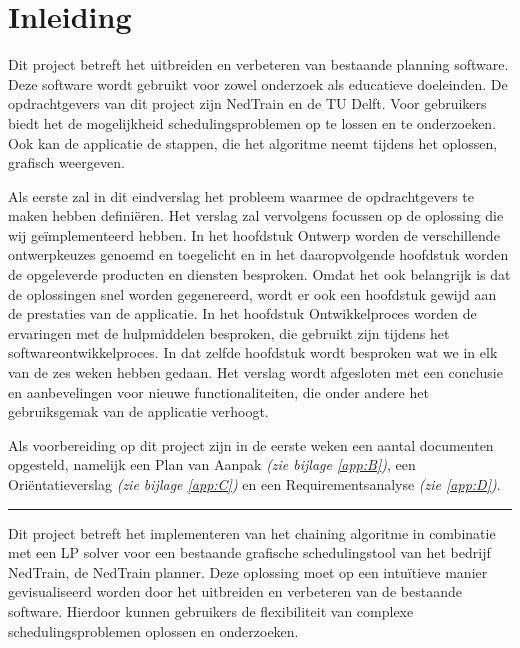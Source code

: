 \section{Inleiding}
Dit project betreft het uitbreiden en verbeteren van bestaande planning software. Deze software wordt gebruikt voor zowel onderzoek als educatieve doeleinden. De opdrachtgevers van dit project zijn NedTrain en de TU Delft. Voor gebruikers biedt het de mogelijkheid schedulingsproblemen op te lossen en te onderzoeken. Ook kan de applicatie de stappen, die het algoritme neemt tijdens het oplossen, grafisch weergeven. 

Als eerste zal in dit eindverslag het probleem waarmee de opdrachtgevers te maken hebben defini\"eren. Het verslag zal vervolgens focussen op de oplossing die wij ge\"implementeerd hebben. In het hoofdstuk Ontwerp worden de verschillende ontwerpkeuzes genoemd en toegelicht en in het daaropvolgende hoofdstuk worden de opgeleverde producten en diensten besproken. Omdat het ook belangrijk is dat de oplossingen snel worden gegenereerd, wordt er ook een hoofdstuk gewijd aan de prestaties van de applicatie. In het hoofdstuk Ontwikkelproces worden de ervaringen met de hulpmiddelen besproken, die gebruikt zijn tijdens het softwareontwikkelproces. In dat zelfde hoofdstuk wordt besproken wat we in elk van de zes weken hebben gedaan. Het verslag wordt afgesloten met een conclusie en aanbevelingen voor nieuwe functionaliteiten, die onder andere het gebruiksgemak van de applicatie verhoogt. 

Als voorbereiding op dit project zijn in de eerste weken een aantal documenten opgesteld, namelijk een Plan van Aanpak \emph{(zie bijlage \ref{app:B})}, een Ori\"entatieverslag \emph{(zie bijlage \ref{app:C})} en een Requirementsanalyse \emph{(zie \ref{app:D})}.

\rule{\textwidth}{1pt}

Dit project betreft het implementeren van het chaining algoritme in combinatie met een LP solver voor een bestaande grafische schedulingstool van het bedrijf NedTrain, de NedTrain planner. Deze oplossing moet op een intu\"itieve manier gevisualiseerd worden door het uitbreiden en verbeteren van de bestaande software. Hierdoor kunnen gebruikers de flexibiliteit van complexe schedulingsproblemen oplossen en onderzoeken.

